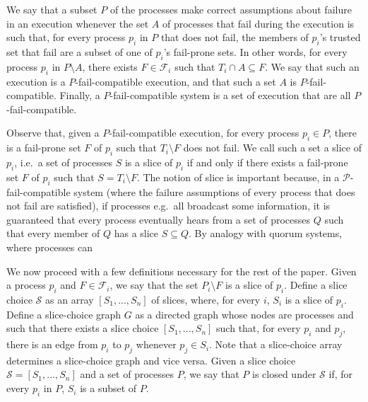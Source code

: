 \documentclass[11pt]{article}
\begin{document}
We say that a subset $P$ of the processes make correct assumptions about failure in an execution whenever the set $A$ of processes that fail during the execution is such that, for every process $p_i$ in $P$ that does not fail, the members of $p_i$'s trusted set that fail are a subset of one of $p_i$'s fail-prone sets.
In other words, for every process $p_i$ in $P\setminus A$, there exists $F\in\mathcal{F}_i$ such that $T_i\cap A \subseteq F$.
We say that such an execution is a $P$-fail-compatible execution, and that such a set $A$ is $P$-fail-compatible.
Finally, a $P$-fail-compatible system is a set of execution that are all $P$-fail-compatible.

Observe that, given a $P$-fail-compatible execution, for every process $p_i\in P$, there is a fail-prone set $F$ of $p_i$ such that $T_i\setminus F$ does not fail.
We call such a set a slice of $p_i$, i.e.\ a set of processes $S$ is a slice of $p_i$ if and only if there exists a fail-prone set $F$ of $p_i$ such that $S=T_i\setminus F$.
The notion of slice is important because, in a $\mathcal{P}$-fail-compatible system (where the failure assumptions of every process that does not fail are satisfied), if processes e.g.\ all broadcast some information, it is guaranteed that every process eventually hears from a set of processes $Q$ such that every member of $Q$ has a slice $S\subseteq Q$.
By analogy with quorum systems, where processes can

We now proceed with a few definitions necessary for the rest of the paper.
Given a process $p_i$ and $F\in \mathcal{F}_i$, we say that the set $P_i\setminus F$ is a slice of $p_i$.
Define a slice choice $\mathcal{S}$ as an array $\left[S_1,...,S_n\right]$ of slices, where, for every $i$, $S_i$ is a slice of $p_i$.
Define a slice-choice graph $G$ as a directed graph whose nodes are processes and such that there exists a slice choice $\left[S_1,...,S_n\right]$ such that, for every $p_i$ and $p_j$, there is an edge from $p_i$ to $p_j$ whenever $p_j\in S_i$. Note that a slice-choice array determines a slice-choice graph and vice versa.
Given a slice choice $\mathcal{S}=\left[S_1,...,S_n\right]$ and a set of processes $P$, we say that $P$ is closed under $\mathcal{S}$ if, for every $p_i$ in $P$, $S_i$ is a subset of $P$.
\end{document}
